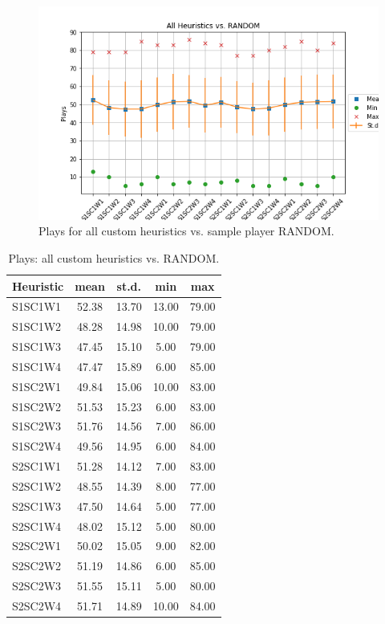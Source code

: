 \documentclass[a4paper]{article}
\begin{document}
    


\begin{figure}[htpb]
\begin{center}
\includegraphics[width=1\columnwidth]{fig/results_Plays_All_vs_RANDOM.png}
\caption{Plays for all custom heuristics vs. sample player RANDOM.}
\end{center}
\label{figplyesRANDOM}
\end{figure}
    

    \begin{table}[htpb]
    \caption{ Plays: all custom heuristics vs. RANDOM.}
    \centering
    \begin{tabular}{ l | c c c c }
    Heuristic & mean & st.d. & min & max \\ \hline 
    S1SC1W1 & 52.38 & 13.70 & 13.00 & 79.00 \\
    S1SC1W2 & 48.28 & 14.98 & 10.00 & 79.00 \\
    S1SC1W3 & 47.45 & 15.10 & 5.00 & 79.00 \\
    S1SC1W4 & 47.47 & 15.89 & 6.00 & 85.00 \\
    S1SC2W1 & 49.84 & 15.06 & 10.00 & 83.00 \\
    S1SC2W2 & 51.53 & 15.23 & 6.00 & 83.00 \\
    S1SC2W3 & 51.76 & 14.56 & 7.00 & 86.00 \\
    S1SC2W4 & 49.56 & 14.95 & 6.00 & 84.00 \\
    S2SC1W1 & 51.28 & 14.12 & 7.00 & 83.00 \\
    S2SC1W2 & 48.55 & 14.39 & 8.00 & 77.00 \\
    S2SC1W3 & 47.50 & 14.64 & 5.00 & 77.00 \\
    S2SC1W4 & 48.02 & 15.12 & 5.00 & 80.00 \\
    S2SC2W1 & 50.02 & 15.05 & 9.00 & 82.00 \\
    S2SC2W2 & 51.19 & 14.86 & 6.00 & 85.00 \\
    S2SC2W3 & 51.55 & 15.11 & 5.00 & 80.00 \\
    S2SC2W4 & 51.71 & 14.89 & 10.00 & 84.00 
    \end{tabular}
    \label{tabplaysRANDOM}
    \end{table}
\end{document}
